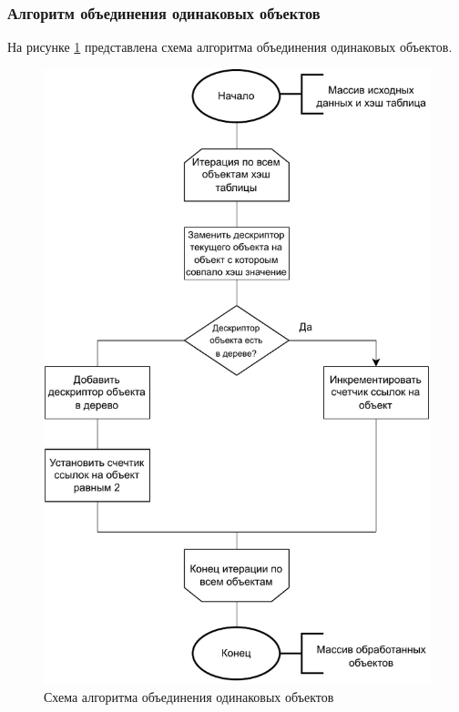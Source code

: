 \subsubsection{Алгоритм объединения одинаковых объектов}

На рисунке \ref{fig:scheme-1} представлена схема алгоритма объединения одинаковых объектов.

\begin{figure}[h]
	\centering
	\includegraphics[scale=1]{img/scheme-1.pdf}
	\caption{Схема алгоритма объединения одинаковых объектов}
	\label{fig:scheme-1}
\end{figure}

\pagebreak
